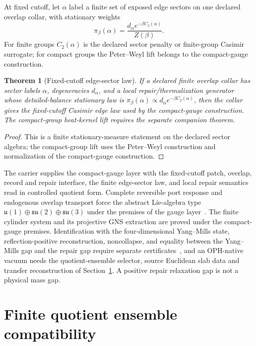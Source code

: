 \documentclass[11pt]{article}
\newtheorem{theorem}{Theorem}[section]
\theoremstyle{remark}
\theoremstyle{plain}
\begin{document}
At fixed cutoff, let \(\alpha\) label a finite set of exposed edge sectors on
one declared overlap collar, with stationary weights
\[
\pi_\beta(\alpha)=\frac{d_\alpha e^{-\beta C_2(\alpha)}}{Z(\beta)}.
\]
For finite groups \(C_2(\alpha)\) is the declared sector penalty or
finite-group Casimir surrogate; for compact groups the Peter--Weyl lift
belongs to the compact-gauge construction.

\begin{theorem}[Fixed-cutoff edge-sector law]
If a declared finite overlap collar has sector labels \(\alpha\), degeneracies \(d_\alpha\), and
a local repair/thermalization generator whose detailed-balance stationary law is
\(\pi_\beta(\alpha)\propto d_\alpha e^{-\beta C_2(\alpha)}\), then the collar gives the
fixed-cutoff Casimir edge law used by the compact-gauge construction. The
compact-group heat-kernel lift requires the separate companion theorem.
\end{theorem}

\begin{proof}
This is a finite stationary-measure statement on the declared sector
algebra; the compact-group lift uses the Peter--Weyl construction and
normalization of the compact-gauge construction.
\end{proof}

The carrier supplies the compact-gauge layer with the fixed-cutoff patch,
overlap, record and repair interface, the finite edge-sector law, and local
repair semantics read in controlled quotient form. Complete reversible port
response and endogenous overlap transport force the abstract Lie-algebra type
\(\mathfrak u(1)\oplus\mathfrak{su}(2)\oplus\mathfrak{su}(3)\) under the
premises of the gauge layer~\cite{ophGauge}. The finite cylinder system and
its projective GNS extraction are proved under the compact-gauge premises.
Identification with the four-dimensional Yang--Mills state,
reflection-positive reconstruction, noncollapse, and equality between the
Yang--Mills gap and the repair gap require separate certificates~\cite{ophym},
and an OPH-native vacuum needs the quotient-ensemble selector, source
Euclidean slab data and transfer reconstruction of
Section~\ref{sec:finite-quotient-ensemble}. A positive repair relaxation gap
is not a physical mass gap.

\section{Finite quotient ensemble compatibility}
\label{sec:finite-quotient-ensemble}
\end{document}
